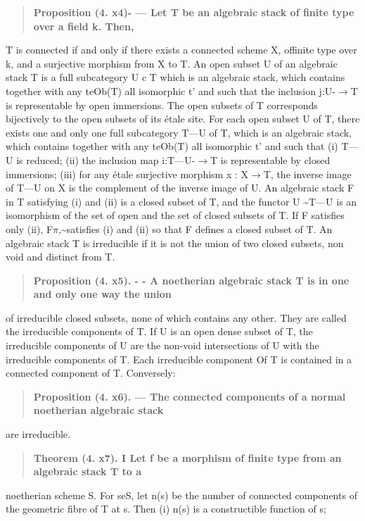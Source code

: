 \documentclass[11pt]{article}
\theoremstyle{plain}
\theoremstyle{definition}
\theoremstyle{remark}
\begin{document}
\begin{quote}\textbf{Proposition (4. x4)- --- Let T be an algebraic stack of finite type over a field k. Then,}\end{quote}
T is connected if and only if there exists a connected scheme X, offinite type over k, and a surjective morphism from X to T. An open subset U of an algebraic stack T is a full subcategory U c T which is an algebraic stack, which contains together with any teOb(T) all isomorphic t' and such that the inclusion j:U-$\to$T is representable by open immersions. The open subsets of T corresponds bijectively to the open subsets of its \'etale site. For each open subset U of T, there exists one and only one full subcategory T---U of T, which is an algebraic stack, which contains together with any teOb(T) all isomorphic t' and such that (i) T---U is reduced; (ii) the inclusion map i:T---U-$\to$T is representable by closed immersions; (iii) for any \'etale surjective morphism x : X$\to$T, the inverse image of T---U on X is the complement of the inverse image of U. An algebraic stack F in T satisfying (i) and (ii) is a closed subset of T, and the functor U \textasciitilde{}T---U is an isomorphism of the set of open and the set of closed subsets of T. If F satisfies only (ii), F$\pi$,\textasciitilde{}satisfies (i) and (ii) so that F defines a closed subset of T. An algebraic stack T is irreducible if it is not the union of two closed subsets, non void and distinct from T.

\begin{quote}\textbf{Proposition (4. x5). - - A noetherian algebraic stack T is in one and only one way the union}\end{quote}
of irreducible closed subsets, none of which contains any other. They are called the irreducible components of T. If U is an open dense subset of T, the irreducible components of U are the non-void intersections of U with the irreducible components of T. Each irreducible component Of T is contained in a connected component of T. Conversely:

\begin{quote}\textbf{Proposition (4. x6). --- The connected components of a normal noetherian algebraic stack}\end{quote}
are irreducible.

\begin{quote}\textbf{Theorem (4. x7). I Let f be a morphism of finite type from an algebraic stack T to a}\end{quote}
noetherian scheme S. For seS, let n(s) be the number of connected components of the geometric fibre of T at s. Then (i) n(s) is a constructible function of s;
\end{document}
